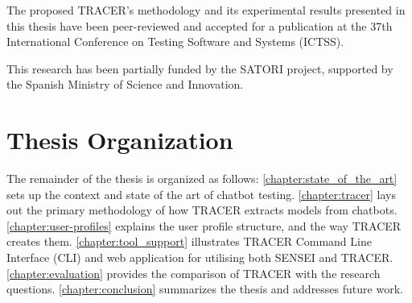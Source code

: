 The proposed \ac{TRACER}'s methodology and its experimental results presented in this thesis
have been peer-reviewed and accepted for a publication at the
37th International Conference on Testing Software and Systems (ICTSS).

This research has been partially funded by the SATORI project, supported by the Spanish Ministry of Science and Innovation.

\section{Thesis Organization}

The remainder of the thesis is organized as follows:
\autoref{chapter:state_of_the_art} sets up the context and state of the art of chatbot testing.
\autoref{chapter:tracer} lays out the primary methodology of how \ac{TRACER} extracts models from chatbots.
\autoref{chapter:user-profiles} explains the user profile structure, and the way \ac{TRACER} creates them.
\autoref{chapter:tool_support} illustrates \ac{TRACER} Command Line Interface (CLI) and web application for utilising both SENSEI and \ac{TRACER}.
\autoref{chapter:evaluation} provides the comparison of \ac{TRACER} with the research questions.
\autoref{chapter:conclusion} summarizes the thesis and addresses future work.
